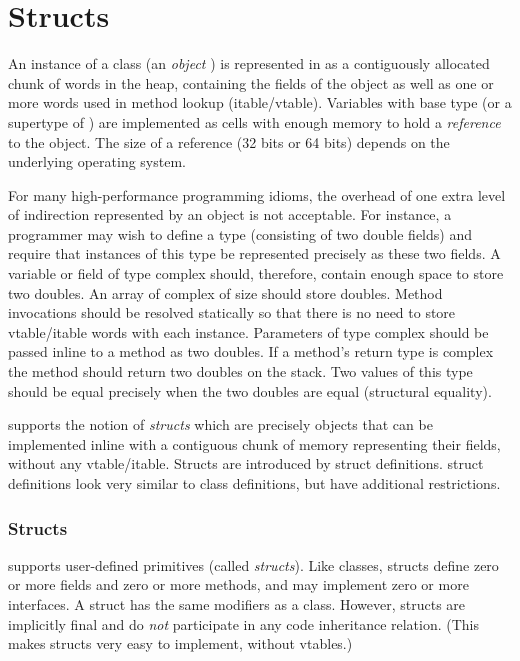 \chapter{Structs}
\label{XtenStructs}
\label{StructClasses}
\label{Structs}

An instance of a class  (an \emph{object} ) is represented in \Xten{} as
a contiguously allocated chunk of words in the heap, containing the
fields of the object as well as one or more words used in method
lookup (itable/vtable). Variables with base type  (or a supertype of
) are implemented as cells with enough memory to hold a
\emph{reference} to the object. The size of a reference (32 bits or 64
bits) depends on the underlying operating system.


For many high-performance programming idioms, the overhead of one
extra level of indirection represented by an object is not
acceptable. For instance, a programmer may wish to define a type
 (consisting of two double fields) and require that instances
of this type be represented precisely as these two fields. A variable
or field of type complex should, therefore, contain enough space to
store two doubles. An array of complex of size  should store 
doubles. Method invocations should be resolved statically so that
there is no need to store vtable/itable words with each
instance. Parameters of type complex should be passed inline to a
method as two doubles. If a method's return type is complex the method
should return two doubles on the stack. Two values of this type should
be equal precisely when the two doubles are equal (structural
equality).


\Xten{} supports the notion of \emph{structs} which are precisely
objects that can be implemented inline with a contiguous chunk of
memory representing their fields, without any vtable/itable. Structs
are introduced by struct definitions. struct definitions look very
similar to class definitions, but have additional restrictions.

\subsection{Structs}
 \Xten{} supports user-defined primitives (called
 \emph{structs}). Like classes, structs define zero or more fields and
 zero or more methods, and may implement zero or more interfaces. A
 struct has the same modifiers as a class. However, structs are
 implicitly final and do \emph{not} participate in any code
 inheritance relation. (This makes structs very easy to implement,
 without vtables.)

